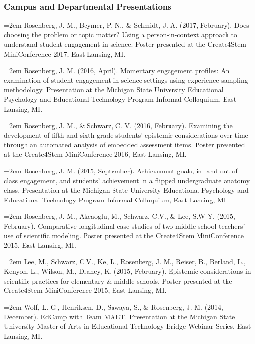 \documentclass[]{article}
\begin{document}
\hypertarget{campus-and-departmental-presentations}{%
\subsubsection{Campus and Departmental
Presentations}\label{campus-and-departmental-presentations}}

\hangindent=2em Rosenberg, J. M., Beymer, P. N., \& Schmidt, J. A.
(2017, February). Does choosing the problem or topic matter? Using a
person-in-context approach to understand student engagement in science.
Poster presented at the Create4Stem MiniConference 2017, East Lansing,
MI.

\hangindent=2em Rosenberg, J. M. (2016, April). Momentary engagement
profiles: An examination of student engagement in science settings using
experience sampling methodology. Presentation at the Michigan State
University Educational Psychology and Educational Technology Program
Informal Colloquium, East Lansing, MI.

\hangindent=2em Rosenberg, J. M., \& Schwarz, C. V. (2016, February).
Examining the development of fifth and sixth grade students' epistemic
considerations over time through an automated analysis of embedded
assessment items. Poster presented at the Create4Stem MiniConference
2016, East Lansing, MI.

\hangindent=2em Rosenberg, J. M. (2015, September). Achievement goals,
in- and out-of-class engagement, and students' achievement in a flipped
undergraduate anatomy class. Presentation at the Michigan State
University Educational Psychology and Educational Technology Program
Informal Colloquium, East Lansing, MI.

\hangindent=2em Rosenberg, J. M., Akcaoglu, M., Schwarz, C.V., \& Lee,
S.W-Y. (2015, February). Comparative longitudinal case studies of two
middle school teachers' use of scientific modeling. Poster presented at
the Create4Stem MiniConference 2015, East Lansing, MI.

\hangindent=2em Lee, M., Schwarz, C.V., Ke, L., Rosenberg, J. M.,
Reiser, B., Berland, L., Kenyon, L., Wilson, M., Draney, K. (2015,
February). Epistemic considerations in scientific practices for
elementary \& middle schools. Poster presented at the Create4Stem
MiniConference 2015, East Lansing, MI.

\hangindent=2em Wolf, L. G., Henriksen, D., Sawaya, S., \& Rosenberg, J.
M. (2014, December). EdCamp with Team MAET. Presentation at the Michigan
State University Master of Arts in Educational Technology Bridge Webinar
Series, East Lansing, MI.
\end{document}
